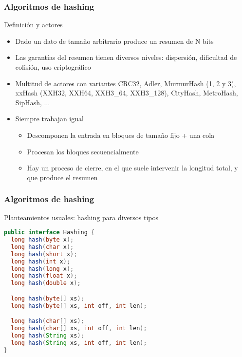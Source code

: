
\def\ft{Algoritmos de hashing}

\begin{frame}[fragile]
  \frametitle{\ft}
  \begin{block}{Definición y actores}
    \begin{itemize}
    \item Dado un dato de tamaño arbitrario produce un resumen de N bits
    \item Las garantías del resumen tienen diversos niveles:
      dispersión, dificultad de colisión, uso criptográfico
    \item Multitud de actores con variantes
      CRC32,
      Adler,
      MurmurHash (1, 2 y 3),
      xxHash (XXH32, XXH64, XXH3\_64, XXH3\_128),
      CityHash,
      MetroHash,
      SipHash,
      ...
    \item Siempre trabajan igual
      \begin{itemize}
      \item Descomponen la entrada en bloques de tamaño fijo + una cola
      \item Procesan los bloques secuencialmente
      \item Hay un proceso de cierre, en el que suele intervenir la longitud
        total, y que produce el resumen
      \end{itemize}
    \end{itemize}
  \end{block}
\end{frame}

\begin{frame}[fragile]
  \frametitle{\ft}
  \begin{block}{Planteamientos usuales: hashing para diversos tipos}
    \begin{lstlisting}[language=java]
public interface Hashing {
  long hash(byte x);
  long hash(char x);
  long hash(short x);
  long hash(int x);
  long hash(long x);
  long hash(float x);
  long hash(double x);

  long hash(byte[] xs);
  long hash(byte[] xs, int off, int len);

  long hash(char[] xs);
  long hash(char[] xs, int off, int len);
  long hash(String xs);
  long hash(String xs, int off, int len);
}
    \end{lstlisting}
  \end{block}
\end{frame}


